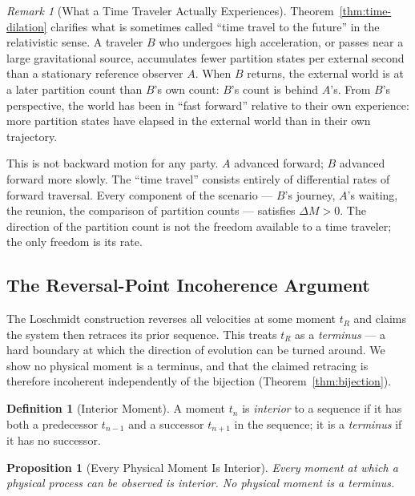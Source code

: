 \documentclass[twocolumn,10pt,a4paper]{article}
\theoremstyle{thmstyle}
\newtheorem{proposition}[theorem]{Proposition}
\theoremstyle{definition}
\newtheorem{definition}[theorem]{Definition}
\theoremstyle{remark}
\newtheorem{remark}[theorem]{Remark}
\begin{document}
\begin{remark}[What a Time Traveler Actually Experiences]
\label{rem:time-traveler-forward}
Theorem~\ref{thm:time-dilation} clarifies what is sometimes called ``time travel to the future'' in the relativistic sense. A traveler $B$ who undergoes high acceleration, or passes near a large gravitational source, accumulates fewer partition states per external second than a stationary reference observer $A$. When $B$ returns, the external world is at a later partition count than $B$'s own count: $B$'s count is behind $A$'s. From $B$'s perspective, the world has been in ``fast forward'' relative to their own experience: more partition states have elapsed in the external world than in their own trajectory.

This is not backward motion for any party. $A$ advanced forward; $B$ advanced forward more slowly. The ``time travel'' consists entirely of differential rates of forward traversal. Every component of the scenario --- $B$'s journey, $A$'s waiting, the reunion, the comparison of partition counts --- satisfies $\Delta M > 0$. The direction of the partition count is not the freedom available to a time traveler; the only freedom is its rate.
\end{remark}

\subsection{The Reversal-Point Incoherence Argument}
\label{sec:reversal-point}

The Loschmidt construction reverses all velocities at some moment $t_R$ and
claims the system then retraces its prior sequence. This treats $t_R$ as a
\emph{terminus} --- a hard boundary at which the direction of evolution can be
turned around. We show no physical moment is a terminus, and that the claimed
retracing is therefore incoherent independently of the bijection
(Theorem~\ref{thm:bijection}).

\begin{definition}[Interior Moment]
\label{def:interior}
A moment $t_n$ is \emph{interior} to a sequence if it has both a predecessor
$t_{n-1}$ and a successor $t_{n+1}$ in the sequence; it is a \emph{terminus}
if it has no successor.
\end{definition}

\begin{proposition}[Every Physical Moment Is Interior]
\label{prop:interior}
Every moment at which a physical process can be observed is interior. No
physical moment is a terminus.
\end{proposition}
\end{document}
